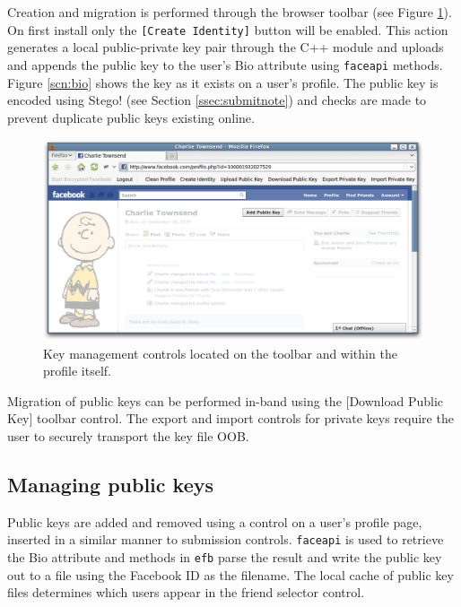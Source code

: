 Creation and migration is performed through the browser toolbar (see Figure \ref{scn:pubkey}). On first install only the {\tt [Create Identity]} button will be enabled. This action generates a local public-private key pair through the C++ module and uploads and appends the public key to the user's Bio attribute using {\tt faceapi} methods. Figure \ref{scn:bio} shows the key as it exists on a user's profile. The public key is encoded using Stego! (see Section \ref{ssec:submitnote}) and checks are made to prevent duplicate public keys existing online.

    \begin{figure}[tbph]
        \begin{center}
        
                \includegraphics[width=12cm]{screens/pubkey.png}

            \caption{Key management controls located on the toolbar and within the profile itself.}
            \label{scn:pubkey}
        \end{center}
    \end{figure}

Migration of public keys can be performed in-band using the [Download Public Key] toolbar control. The export and import controls for private keys require the user to securely transport the key file OOB.

    
\subsection{Managing public keys}
\label{ssec:mankeys}

Public keys are added and removed using a control on a user's profile page, inserted in a similar manner to submission controls. {\tt faceapi} is used to retrieve the Bio attribute and methods in {\tt efb} parse the result and write the public key out to a file using the Facebook ID as the filename. The local cache of public key files determines which users appear in the friend selector control.
    

